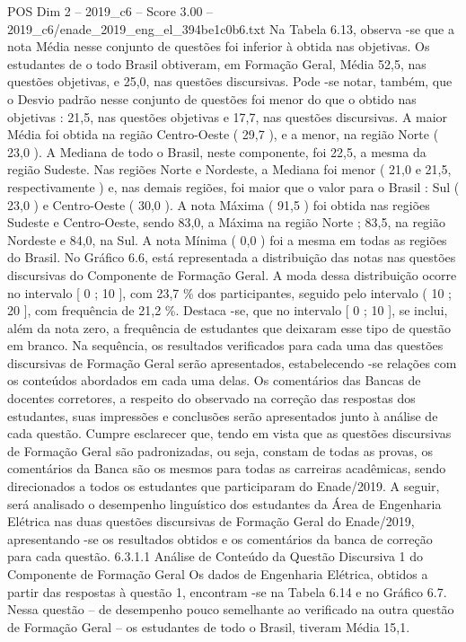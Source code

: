 \begin{textsample}{POS Dim 2 – 2019\_c6 – Score 3.00 – 2019\_c6/enade\_2019\_eng\_el\_394be1c0b6.txt}
Na Tabela 6.13, observa -se que a nota Média nesse conjunto de questões foi inferior à obtida nas objetivas.
Os estudantes de o todo Brasil obtiveram, em Formação Geral, Média 52,5, nas questões objetivas, e 25,0, nas questões discursivas.
Pode -se notar, também, que o Desvio padrão nesse conjunto de questões foi menor do que o obtido nas objetivas : 21,5, nas questões objetivas e 17,7, nas questões discursivas.
A maior Média foi obtida na região Centro-Oeste ( 29,7 ), e a menor, na região Norte ( 23,0 ).
A Mediana de todo o Brasil, neste componente, foi 22,5, a mesma da região Sudeste.
Nas regiões Norte e Nordeste, a Mediana foi menor ( 21,0 e 21,5, respectivamente ) e, nas demais regiões, foi maior que o valor para o Brasil : Sul ( 23,0 ) e Centro-Oeste ( 30,0 ).
A nota Máxima ( 91,5 ) foi obtida nas regiões Sudeste e Centro-Oeste, sendo 83,0, a Máxima na região Norte ; 83,5, na região Nordeste e 84,0, na Sul.
A nota Mínima ( 0,0 ) foi a mesma em todas as regiões do Brasil.
No Gráfico 6.6, está representada a distribuição das notas nas questões discursivas do Componente de Formação Geral.
A moda dessa distribuição ocorre no intervalo [ 0 ; 10 ], com 23,7 \% dos participantes, seguido pelo intervalo ( 10 ; 20 ], com frequência de 21,2 \%.
Destaca -se, que no intervalo [ 0 ; 10 ], se inclui, além da nota zero, a frequência de estudantes que deixaram esse tipo de questão em branco.
Na sequência, os resultados verificados para cada uma das questões discursivas de Formação Geral serão apresentados, estabelecendo -se relações com os conteúdos abordados em cada uma delas.
Os comentários das Bancas de docentes corretores, a respeito do observado na correção das respostas dos estudantes, suas impressões e conclusões serão apresentados junto à análise de cada questão.
Cumpre esclarecer que, tendo em vista que as questões discursivas de Formação Geral são padronizadas, ou seja, constam de todas as provas, os comentários da Banca são os mesmos para todas as carreiras acadêmicas, sendo direcionados a todos os estudantes que participaram do Enade/2019.
A seguir, será analisado o desempenho linguístico dos estudantes da Área de Engenharia Elétrica nas duas questões discursivas de Formação Geral do Enade/2019, apresentando -se os resultados obtidos e os comentários da banca de correção para cada questão. 6.3.1.1 Análise de Conteúdo da Questão Discursiva 1 do Componente de Formação Geral Os dados de Engenharia Elétrica, obtidos a partir das respostas à questão 1, encontram -se na Tabela 6.14 e no Gráfico 6.7.
Nessa questão – de desempenho pouco semelhante ao verificado na outra questão de Formação Geral – os estudantes de todo o Brasil, tiveram Média 15,1.

\end{textsample}
